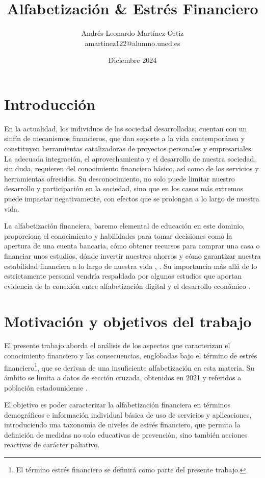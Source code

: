 \documentclass[a4paper, 11pt, bibliography=numbered, es]{article}
\title{Alfabetización \& Estrés Financiero}
\author{Andrés-Leonardo Martínez-Ortiz \\ amartinez122@alumno.uned.es}
\date{Diciembre 2024}
\begin{document}
\maketitle
\section{Introducción}
En la actualidad, los individuos de las sociedad desarrolladas, cuentan con 
un sinfín de mecanismos financieros, que dan soporte a la vida contemporánea
y constituyen herramientas catalizadoras de proyectos personales y empresariales. 
La adecuada integración, el aprovechamiento y el desarrollo de
nuestra sociedad, sin duda, requieren del conocimiento financiero básico, así como
de los servicios y herramientas ofrecidas. Su desconocimiento, no solo puede limitar
nuestro desarrollo y participación en la sociedad, sino que en los casos más extremos
puede impactar negativamente, con efectos que se prolongan a lo largo de nuestra
vida. 

La alfabetización financiera, baremo elemental de educación en este dominio, 
proporciona el conocimiento y habilidades para tomar decisiones como la 
apertura de una cuenta bancaria, cómo obtener recursos para comprar una
casa o financiar unos estudios, dónde invertir nuestros ahorros y cómo 
garantizar nuestra estabilidad financiera a lo largo de nuestra vida
\cite{EU01}, \cite{OCDE01}. Su importancia más allá de lo estrictamente personal 
vendría respaldada por algunos estudios que aportan evidencia de
la conexión entre alfabetización digital y el desarrollo económico \cite{Lusardi14}. 

\section{Motivación y objetivos del trabajo}
\label{motivacion}
El presente trabajo aborda el análisis de los aspectos que caracterizan el conocimiento 
financiero y las consecuencias, englobadas bajo el término de estrés financiero\footnote{El término
estrés financiero se definirá como parte del presente trabajo.}, que se derivan de una insuficiente
alfabetización en esta materia. Su ámbito se limita a datos de sección cruzada, obtenidos en 2021 y 
referidos a población estadounidense \cite{NFCS01}.

El objetivo es poder caracterizar la alfabetización financiera en términos demográficos e información
individual básica de uso de servicios y aplicaciones, introduciendo una taxonomía de niveles de estrés
financiero, que permita la definición de medidas no solo educativas de prevención, sino también acciones
reactivas de carácter paliativo.
\end{document}
